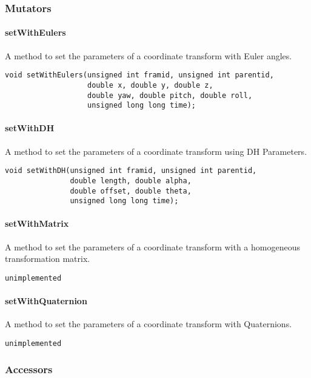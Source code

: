 \documentclass[12pt]{article}
\begin{document}
\subsubsection{Mutators}

\paragraph{setWithEulers}
A method to set the parameters of a coordinate transform with Euler angles. 
\begin{verbatim}
void setWithEulers(unsigned int framid, unsigned int parentid, 
                   double x, double y, double z, 
                   double yaw, double pitch, double roll, 
                   unsigned long long time);
\end{verbatim}

\paragraph{setWithDH}
A method to set the parameters of a coordinate transform using DH Parameters. 
\begin{verbatim} 
void setWithDH(unsigned int framid, unsigned int parentid, 
               double length, double alpha, 
               double offset, double theta, 
               unsigned long long time);
\end{verbatim}



\paragraph{setWithMatrix}
A method to set the parameters of a coordinate transform with a homogeneous transformation matrix. 
\begin{verbatim}
unimplemented
\end{verbatim}

\paragraph{setWithQuaternion}
A method to set the parameters of a coordinate transform with Quaternions. 
\begin{verbatim}
unimplemented
\end{verbatim}


\subsubsection{Accessors}
\label{libTFAPI accessors}
\end{document}
